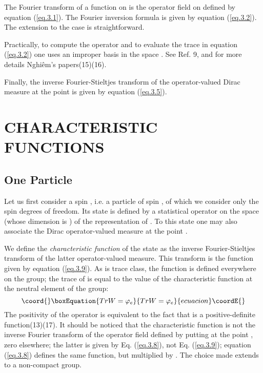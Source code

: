 \documentclass[a4paper,11pt]{article}
\begin{document}
The Fourier transform of a function on \coordHE{} is the operator field on \coordHE{} defined by 
equation (\ref{eq.3.1}). 
The Fourier inversion formula is given by equation (\ref{eq.3.2}). The extension to the case 
\coordHE{} is straightforward. 

Practically, to compute the operator \coordHE{} and to evaluate the trace in 
equation (\ref{eq.3.2}) one uses 
an improper basis in the space \myHighlight{$\Hc_{\chi}$}\coordHE{}. See Ref. 9, and for more details Nghi\^em's 
papers(15)(16). 

Finally, the inverse Fourier-Stieltjes transform of the operator-valued Dirac measure \coordHE{} at 
the point \myHighlight{$\chi$}\coordHE{} is given by equation (\ref{eq.3.5}).

\section{CHARACTERISTIC FUNCTIONS}

\subsection{One Particle}

Let us first consider a spin \coordHE{}, i.e. a particle of spin \coordHE{}, of which we consider only the 
spin 
degrees of freedom. Its state is defined by a statistical operator \coordHE{} on the space \coordHE{} 
(whose 
dimension is \coordHE{}) of the representation \coordHE{} of \coordHE{}. To this state one may also associate 
the Dirac operator-valued measure \coordHE{} at the point \coordHE{}. 

We define the {\it characteristic function} of the state as the inverse Fourier-Stieltjes 
transform 
of the latter operator-valued measure. This transform is the function \myHighlight{$\varphi$}\coordHE{} given by 
equation 
(\ref{eq.3.9}). As \coordHE{} is trace class, the function is defined everywhere on the group; the 
trace 
of \coordHE{} is equal to the value of the characteristic function at the neutral element of the 
group:
\begin{equation}\coord{}\boxEquation{
 \label{eq.4.1}
  Tr W = \varphi_e
}{
 Tr W = \varphi_e
}{ecuacion}\coordE{}\end{equation}
The positivity of the operator \coordHE{} is equivalent to the fact that \myHighlight{$\varphi$}\coordHE{} is a 
positive-definite function(13)(17). 
It should be noticed that the characteristic function is not the inverse Fourier transform of 
the operator field defined by putting \coordHE{} at the point \coordHE{}, zero elsewhere; the latter is given 
by 
Eq. (\ref{eq.3.8}), not Eq. (\ref{eq.3.9}); equation (\ref{eq.3.8}) defines the same function, 
but multiplied by \coordHE{}. The choice made extends to a non-compact group. 
\end{document}
